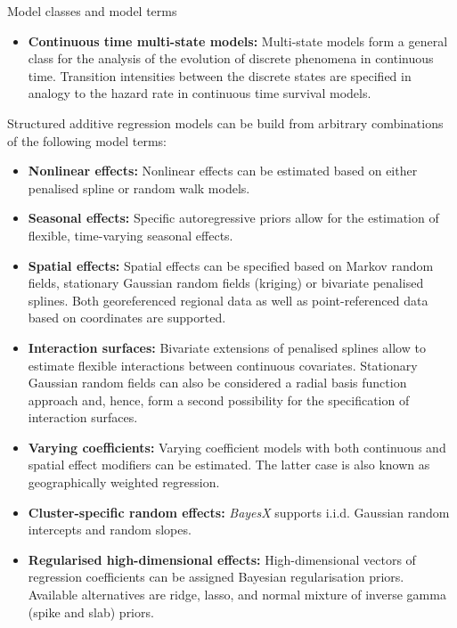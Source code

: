 \begin{stanza}{Model classes and model terms}
\begin{itemize}
\item{\bf\sffamily Continuous time multi-state models:} Multi-state models form a general class for the analysis of the
    evolution of discrete phenomena in continuous time. Transition intensities between the discrete states are specified in
    analogy to the hazard rate in continuous time survival models.
\end{itemize}

Structured additive regression models can be build from arbitrary
combinations of the following model terms:

\begin{itemize}
\item{\bf\sffamily Nonlinear effects:} Nonlinear effects can be estimated based on either penalised spline or random walk
    models.

\item{\bf\sffamily Seasonal effects:} Specific autoregressive priors allow for the estimation of flexible, time-varying
    seasonal effects.

\item{\bf\sffamily Spatial effects:} Spatial effects can be specified based on Markov random fields, stationary Gaussian
    random fields (kriging) or bivariate penalised splines. Both georeferenced regional data as well as point-referenced
    data based on coordinates are supported.

\item{\bf\sffamily Interaction surfaces:} Bivariate extensions of penalised splines allow to estimate flexible interactions
    between continuous covariates. Stationary Gaussian random fields can also be considered a radial basis function
    approach and, hence, form a second possibility for the specification of interaction surfaces.

\item{\bf\sffamily Varying coefficients:} Varying coefficient models with both continuous and spatial effect modifiers can
    be estimated. The latter case is also known as geographically weighted regression.

\item{\bf\sffamily Cluster-specific random effects:} {\em BayesX} supports i.i.d. Gaussian random intercepts and random
    slopes.

\item {\bf\sffamily Regularised high-dimensional effects:} High-dimensional vectors of regression coefficients can be
    assigned Bayesian regularisation priors. Available alternatives are ridge, lasso, and normal mixture of inverse gamma
    (spike and slab) priors.


\end{itemize}
\end{stanza}
